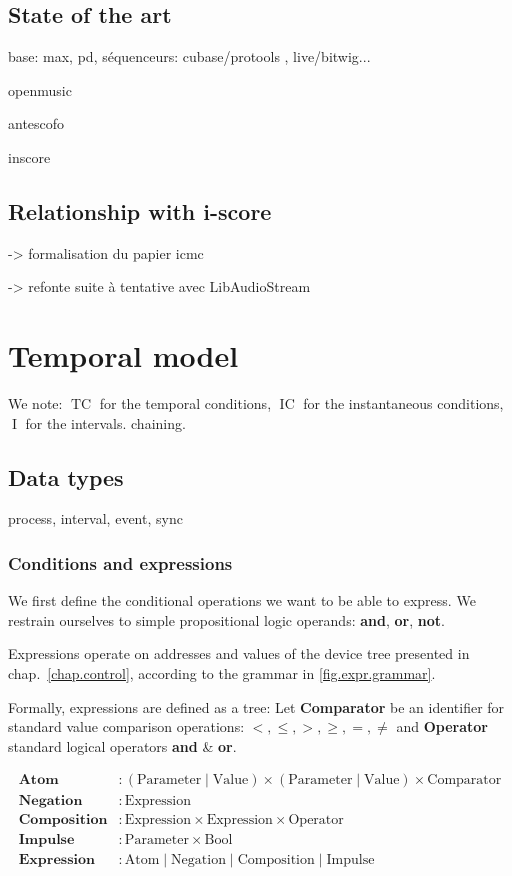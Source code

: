\documentclass[applsci,article,submit,moreauthors,pdftex,10pt,a4paper]{mdpi}
\DeclareMathOperator{\tc}{TC}
\DeclareMathOperator{\ic}{IC}
\DeclareMathOperator{\itv}{I}
\begin{document}
\subsection{State of the art}
base: max, pd, séquenceurs: cubase/protools , live/bitwig...

openmusic

antescofo

inscore

\subsection{Relationship with i-score}
-> formalisation du papier icmc

-> refonte suite à tentative avec LibAudioStream

\section{Temporal model}
We note: $\tc$ for the temporal conditions, $\ic$ for the instantaneous conditions, $\itv$ for the intervals.
chaining.
\subsection{Data types}
process, interval, event, sync



\subsubsection{Conditions and expressions}

We first define the conditional operations we want to be able to express.
We restrain ourselves to simple propositional logic operands: \textbf{and}, \textbf{or}, \textbf{not}.

Expressions operate on addresses and values of the device tree presented in chap.~\ref{chap.control}, according to the grammar in \ref{fig.expr.grammar}.

Formally, expressions are defined as a tree:
Let \textbf{Comparator} be an identifier for standard value comparison operations: $<, \leq, >, \geq, =, \neq$ and \textbf{Operator} standard logical operators \textbf{and} \&  \textbf{or}.

\begin{align*}
    \mathbf{Atom} & :  (\mathrm{Parameter} \mid \mathrm{Value}) \times (\mathrm{Parameter} \mid \mathrm{Value}) \times \mathrm{Comparator} \\
    \mathbf{Negation} & : \mathrm{Expression} \\
    \mathbf{Composition} & : \mathrm{Expression} \times \mathrm{Expression} \times \mathrm{Operator} \\
    \mathbf{Impulse} & : \mathrm{Parameter} \times \mathrm{Bool} \\
    \mathbf{Expression} &: \mathrm{Atom} \mid \mathrm{Negation} \mid \mathrm{Composition} \mid \mathrm{Impulse}
\end{align*}
\end{document}
